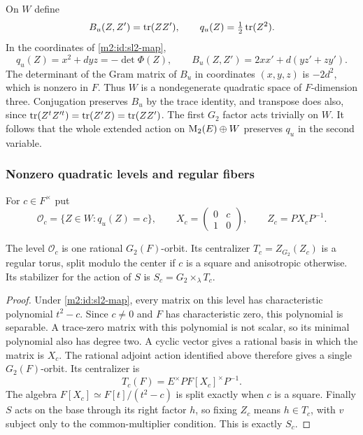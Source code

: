 On $W$ define
\begin{equation}\label{m2:id:quadratic-form}
 B_u(Z,Z')=\operatorname{tr}(ZZ'),\qquad q_u(Z)=\tfrac12\operatorname{tr}(Z^2).
\end{equation}
In the coordinates of \eqref{m2:id:sl2-map},
\[
 q_u(Z)=x^2+dyz=-\det\Phi(Z),
 \qquad
 B_u(Z,Z')=2xx'+d(yz'+zy').
\]
The determinant of the Gram matrix of $B_u$ in coordinates
$(x,y,z)$ is $-2d^2$, which is nonzero in $F$. Thus $W$ is a
nondegenerate quadratic space of $F$-dimension three.
Conjugation preserves $B_u$ by the trace identity, and transpose
does also, since $\operatorname{tr}(Z^tZ'^t)=\operatorname{tr}(Z'Z)=\operatorname{tr}(ZZ')$.
The first $G_2$ factor acts trivially on $W$. It follows that the whole
extended action on $\operatorname{M}_2(E)\oplus W$ preserves $q_u$ in the second
variable.

\subsubsection{Nonzero quadratic levels and regular fibers}

For $c\in F^\times$ put
\[
 \mathcal O_c=\{Z\in W:q_u(Z)=c\},\qquad
 X_c=\begin{pmatrix}0&c\\1&0\end{pmatrix},\qquad
 Z_c=PX_cP^{-1}.
\]

\begin{lemma}\label{m2:id:nonzero-orbit}
The level $\mathcal O_c$ is one rational $G_2(F)$-orbit. Its
centralizer $T_c=Z_{G_2}(Z_c)$ is a regular torus, split modulo the
center if $c$ is a square and anisotropic otherwise. Its stabilizer
for the action of $S$ is $S_c=G_2\times_\lambda T_c$.
\end{lemma}

\begin{proof}
Under \eqref{m2:id:sl2-map}, every matrix on this level has
characteristic polynomial $t^2-c$. Since $c\ne0$ and $F$ has
characteristic zero, this polynomial is separable. A trace-zero
matrix with this polynomial is not scalar, so its minimal polynomial
also has degree two. A cyclic vector gives a rational basis in which
the matrix is $X_c$. The rational adjoint action identified above
therefore gives a single $G_2(F)$-orbit.
Its centralizer is
\[
 T_c(F)=E^\times P F[X_c]^\times P^{-1}.
\]
The algebra $F[X_c]\simeq F[t]/(t^2-c)$ is split exactly when $c$ is
a square. Finally $S$ acts on the base through its right factor $h$,
so fixing $Z_c$ means $h\in T_c$, with $v$ subject only to the
common-multiplier condition. This is exactly $S_c$.
\end{proof}

